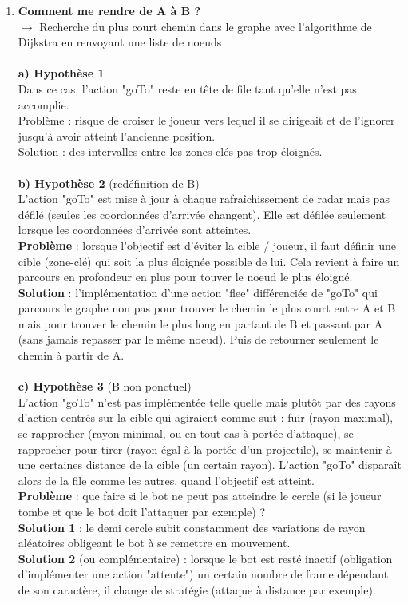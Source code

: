 \begin{enumerate}
	\item \textbf{Comment me rendre de A à B ?}\\
$\rightarrow$ Recherche du plus court chemin dans le graphe avec l'algorithme de Dijkstra en renvoyant une liste de noeuds
\\\\
\textbf{a) Hypothèse 1}\\
Dans ce cas, l'action "goTo" reste en tête de file tant qu'elle n'est pas accomplie.\\
Problème : risque de croiser le joueur vers lequel il se dirigeait et de l'ignorer jusqu'à avoir atteint l'ancienne position.\\
Solution : des intervalles entre les zones clés pas trop éloignés.\\
\\
\textbf{b) Hypothèse 2} (redéfinition de B)\\
L'action "goTo" est mise à jour à chaque rafra\^ichissement de radar mais pas défilé (seules les coordonnées d'arrivée changent). Elle est défilée seulement lorsque les coordonnées d'arrivée sont atteintes.\\
\textbf{Problème} : lorsque l'objectif est d'éviter la cible / joueur, il faut définir une cible (zone-clé) qui soit la plus éloignée possible de lui. Cela revient à faire un parcours en profondeur en plus pour touver le noeud le plus éloigné.\\
\textbf{Solution} : l'implémentation d'une action "flee" différenciée de "goTo" qui parcours le graphe non pas pour trouver le chemin le plus court entre A et B mais pour trouver le chemin le plus long en partant de B et passant par A (sans jamais repasser par le même noeud). Puis de retourner seulement le chemin à partir de A.
\\\\
\textbf{c) Hypothèse 3} (B non ponctuel)\\
L'action "goTo" n'est pas implémentée telle quelle mais plutôt par des rayons d'action centrés sur la cible qui agiraient comme suit : fuir (rayon maximal), se rapprocher (rayon minimal, ou en tout cas à portée d'attaque), se rapprocher pour tirer (rayon égal à la portée d'un projectile), se maintenir à une certaines distance de la cible (un certain rayon). L'action "goTo" dispara\^it alors de la file comme les autres, quand l'objectif est atteint.\\
\textbf{Problème} : que faire si le bot ne peut pas atteindre le cercle (si le joueur tombe et que le bot doit l'attaquer par exemple) ?\\
\textbf{Solution 1} : le demi cercle subit constamment des variations de rayon aléatoires obligeant le bot à se remettre en mouvement. \\
\textbf{Solution 2} (ou complémentaire) : lorsque le bot est resté inactif (obligation d'implémenter une action "attente") un certain nombre de frame dépendant de son caractère, il change de stratégie (attaque à distance par exemple). 
 
\end{enumerate}
 


